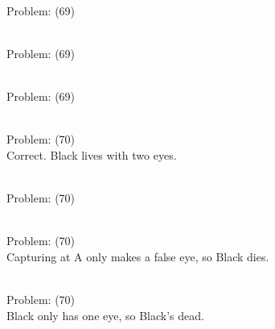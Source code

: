 \documentclass[11pt]{article}
\begin{document}
\begin{minipage}[t]{0.5\textwidth}
  {\centering
  
\\
Problem: (69)\\
  }
\end{minipage}
\begin{minipage}[t]{0.5\textwidth}
  {\centering
  
\\
Problem: (69)\\
  }
\end{minipage}
\begin{minipage}[t]{0.5\textwidth}
  {\centering
  
\\
Problem: (69)\\
  }
\end{minipage}
\begin{minipage}[t]{0.5\textwidth}
  {\centering
  
\\
Problem: (70)\\
Correct. Black lives with two eyes.\\
  }
\end{minipage}
\begin{minipage}[t]{0.5\textwidth}
  {\centering
  
\\
Problem: (70)\\
  }
\end{minipage}
\begin{minipage}[t]{0.5\textwidth}
  {\centering
  
\\
Problem: (70)\\
Capturing at A only makes a false eye, so Black dies.\\
  }
\end{minipage}
\begin{minipage}[t]{0.5\textwidth}
  {\centering
  
\\
Problem: (70)\\
Black only has one eye, so Black's dead.\\
  }
\end{minipage}
\end{document}
